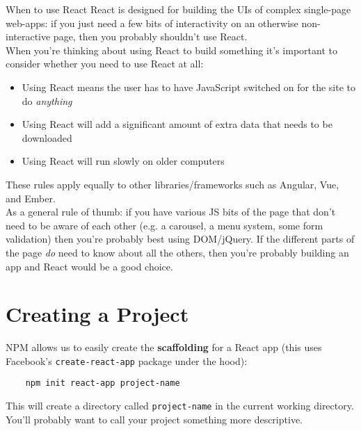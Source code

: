 \begin{infobox}{When to use React}
    React is designed for building the UIs of complex single-page web-apps: if you just need a few bits of interactivity on an otherwise non-interactive page, then you probably shouldn't use React.
    \\

    When you're thinking about using React to build something it's important to consider whether you need to use React at all:

    \begin{itemize}
        \item Using React means the user has to have JavaScript switched on for the site to do \textit{anything}
        \item Using React will add a significant amount of extra data that needs to be downloaded
        \item Using React will run slowly on older computers
    \end{itemize}

    These rules apply equally to other libraries/frameworks such as Angular, Vue, and Ember.
    \\

    As a general rule of thumb: if you have various JS bits of the page that don't need to be aware of each other (e.g. a carousel, a menu system, some form validation) then you're probably best using DOM/jQuery. If the different parts of the page \textit{do} need to know about all the others, then you're probably building an app and React would be a good choice.
\end{infobox}


\pagebreak


\section{Creating a Project}

NPM allows us to easily create the \textbf{scaffolding} for a React app (this uses Facebook's \texttt{create-react-app} package under the hood):

\begin{verbatim}
    npm init react-app project-name
\end{verbatim}

This will create a directory called \texttt{project-name} in the current working directory. You'll probably want to call your project something more descriptive.
\\

